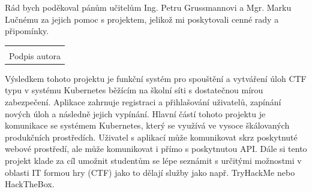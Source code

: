 \documentclass[12pt, a4paper,
oneside,      %
openright
]{report}
\newcommand\datumOdevzdani{6. 1. 2025} %
\begin{document}

	
	\noindent Rád bych poděkoval pánům učitelům Ing. Petru Grussmannovi a Mgr. Marku Lučnému za jejich pomoc s projektem, jelikož mi poskytovali cenné rady a připomínky.

	
	\vspace*{0.7\textheight} %

	\vfill
	\noindent{V Opavě \datumOdevzdani\\}
	\noindent
	\begin{minipage}{\linewidth}
		\hspace{9.5cm} 
		\begin{tabular}{@{}p{6cm}@{}}
			\dotfill \\
			Podpis autora
		\end{tabular}
	\end{minipage}
	
	\cleardoublepage %


	\noindent Výsledkem tohoto projektu je funkční systém pro spouštění a vytváření úloh CTF typu v systému Kubernetes běžícím na školní síti s dostatečnou mírou zabezpečení. Aplikace zahrnuje registraci a přihlašování uživatelů, zapínání nových úloh a následně jejich vypínání. Hlavní částí tohoto projektu je komunikace se systémem Kubernetes, který se využívá ve vysoce škálovaných produkčních prostředích. Uživatel s aplikací může komunikovat skrz poskytnuté webové prostředí, ale může komunikovat i přímo s poskytnutou API. Dále si tento projekt klade za cíl umožnit studentům se lépe seznámit s určitými možnostmi v oblasti IT formou hry (CTF) jako to dělají služby jako např. TryHackMe nebo HackTheBox.
	
\end{document}
